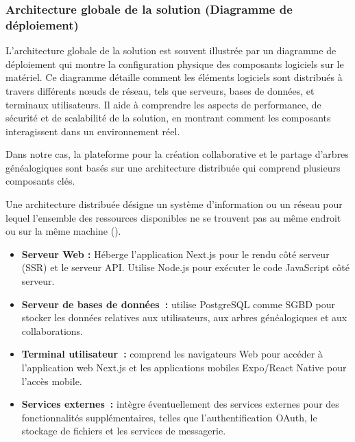 \subsubsection{Architecture globale de la solution (Diagramme de déploiement)}
L’architecture globale de la solution est souvent illustrée par un diagramme de
déploiement qui montre la configuration physique des composants logiciels sur
le matériel. Ce diagramme détaille comment les éléments logiciels sont
distribués à travers différents nœuds de réseau, tels que serveurs, bases de
données, et terminaux utilisateurs. Il aide à comprendre les aspects de
performance, de sécurité et de scalabilité de la solution, en montrant comment
les composants interagissent dans un environnement réel.

Dans notre cas, la plateforme pour la création collaborative et le partage
d’arbres généalogiques sont basés sur une architecture distribuée qui
comprend plusieurs composants clés.

Une architecture distribuée  désigne un système d'information ou un réseau pour
lequel l'ensemble des ressources disponibles ne se trouvent pas au même endroit
ou sur la même machine (\textcite{frwiki:212787328}).


\begin{itemize}
  \item \textbf{ Serveur Web :} Héberge l'application Next.js pour le rendu
    côté serveur (SSR) et le serveur API. Utilise Node.js pour exécuter le
    code JavaScript côté serveur.

  \item \textbf{Serveur de bases de données :} utilise PostgreSQL comme SGBD
    pour stocker les données relatives aux utilisateurs, aux arbres
    généalogiques et aux collaborations.

  \item \textbf{ Terminal utilisateur :} comprend les navigateurs Web pour
    accéder à l’application web Next.js et les applications mobiles Expo/React
    Native pour l’accès mobile.

  \item \textbf{Services externes :} intègre éventuellement des services
    externes pour des fonctionnalités supplémentaires, telles que
    l’authentification OAuth, le stockage de fichiers et les
    services de messagerie.

\end{itemize}

